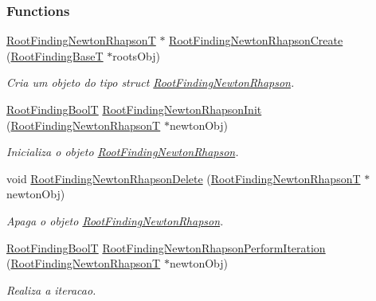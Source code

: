 \subsubsection*{Functions}
\begin{CompactItemize}
\item 
\hyperlink{structRootFindingNewtonRhapson}{RootFindingNewtonRhapsonT} $\ast$ \hyperlink{group____newton_ga2ec468a98e05720903ac94228426bed}{RootFindingNewtonRhapsonCreate} (\hyperlink{structRootFindingBase}{RootFindingBaseT} $\ast$rootsObj)
\begin{CompactList}\small\item\em Cria um objeto do tipo struct \hyperlink{structRootFindingNewtonRhapson}{RootFindingNewtonRhapson}. \item\end{CompactList}\item 
\hyperlink{RootFindingCommon_8h_31228d356f5429fa5ba7f206e4dee12f}{RootFindingBoolT} \hyperlink{group____newton_g3e1d44e30555a4b12ac1a0c56a75ba5e}{RootFindingNewtonRhapsonInit} (\hyperlink{structRootFindingNewtonRhapson}{RootFindingNewtonRhapsonT} $\ast$newtonObj)
\begin{CompactList}\small\item\em Inicializa o objeto \hyperlink{structRootFindingNewtonRhapson}{RootFindingNewtonRhapson}. \item\end{CompactList}\item 
void \hyperlink{group____newton_g40efb00500a3157208d224b3942ec915}{RootFindingNewtonRhapsonDelete} (\hyperlink{structRootFindingNewtonRhapson}{RootFindingNewtonRhapsonT} $\ast$newtonObj)
\begin{CompactList}\small\item\em Apaga o objeto \hyperlink{structRootFindingNewtonRhapson}{RootFindingNewtonRhapson}. \item\end{CompactList}\item 
\hyperlink{RootFindingCommon_8h_31228d356f5429fa5ba7f206e4dee12f}{RootFindingBoolT} \hyperlink{group____newton_g730f69beaf24e0c2ecfa81a124a09987}{RootFindingNewtonRhapsonPerformIteration} (\hyperlink{structRootFindingNewtonRhapson}{RootFindingNewtonRhapsonT} $\ast$newtonObj)
\begin{CompactList}\small\item\em Realiza a iteracao. \item\end{CompactList}\item 

\end{CompactItemize}
